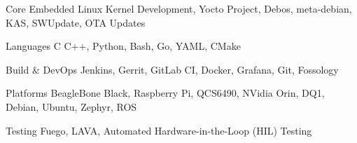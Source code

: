 

\begin{cvskills}

  \cvskill
    {Core Embedded} %
    {Linux Kernel Development, Yocto Project, Debos, meta-debian, KAS, SWUpdate, OTA Updates} %

  \cvskill
    {Languages} %
    {C C++, Python, Bash, Go, YAML, CMake} %

  \cvskill
    {Build \& DevOps} %
    {Jenkins, Gerrit, GitLab CI, Docker, Grafana, Git, Fossology} %

  \cvskill
    {Platforms} %
    {BeagleBone Black, Raspberry Pi, QCS6490, NVidia Orin, DQ1, Debian, Ubuntu, Zephyr, ROS} %

  \cvskill
    {Testing} %
    {Fuego, LAVA, Automated Hardware-in-the-Loop (HIL) Testing} %

\end{cvskills}

